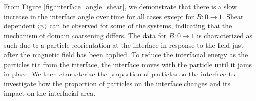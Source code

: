 From Figure \ref{fig:interface_angle_shear}, we demonstrate that there is a slow increase in the interface angle over time for all cases
except for $\bar{B}: 0 \to 1$. Shear dependent $\langle \psi \rangle$ can be observed for some of the systems, indicating that the mechanism
of domain coarsening differs. The data for $\bar{B}: 0 \to 1$ is characterized as such due to a particle reorientation at the interface
in response to the field just after the magnetic field has been applied. To reduce the interfacial energy as the particles tilt from the 
interface, the interface moves with the particle until it jams in place. We then characterize the proportion 
of particles on the interface to investigate how the proportion of particles on the interface changes and its impact on the interfacial area.




